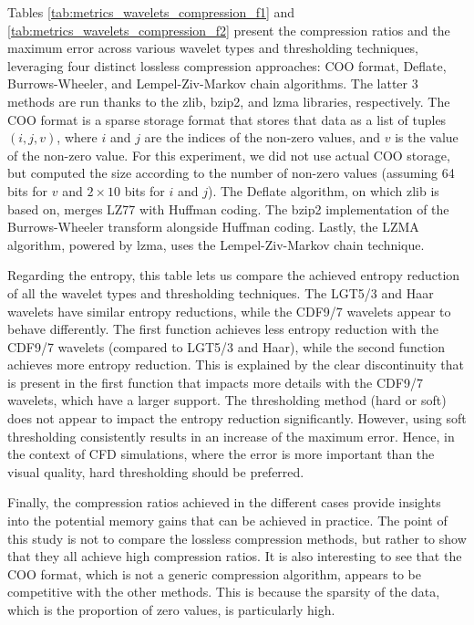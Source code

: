 Tables \ref{tab:metrics_wavelets_compression_f1} and \ref{tab:metrics_wavelets_compression_f2} present the compression ratios and the maximum error across various wavelet types and thresholding techniques, leveraging four distinct lossless compression approaches: COO format, Deflate, Burrows-Wheeler, and Lempel-Ziv-Markov chain algorithms.
The latter 3 methods are run thanks to the zlib, bzip2, and lzma libraries, respectively.
The COO format is a sparse storage format that stores that data as a list of tuples $(i,j,v)$, where $i$ and $j$ are the indices of the non-zero values, and $v$ is the value of the non-zero value.
For this experiment, we did not use actual COO storage, but computed the size according to the number  of non-zero values (assuming 64 bits for $v$ and $2\times10$ bits for $i$ and $j$).
The Deflate algorithm, on which zlib is based on, merges LZ77 with Huffman coding.
The bzip2 implementation of the Burrows-Wheeler transform alongside Huffman coding.
Lastly, the LZMA algorithm, powered by lzma, uses the Lempel-Ziv-Markov chain technique.

Regarding the entropy, this table lets us compare the achieved entropy reduction of all the wavelet types and thresholding techniques.
The LGT5/3 and Haar wavelets have similar entropy reductions, while the CDF9/7 wavelets appear to behave differently.
The first function achieves less entropy reduction with the CDF9/7 wavelets (compared to LGT5/3 and Haar), while the second function achieves more entropy reduction.
This is explained by the clear discontinuity that is present in the first function that impacts more details with the CDF9/7 wavelets, which have a larger support.
The thresholding method (hard or soft) does not appear to impact the entropy reduction significantly.
However, using soft thresholding consistently results in an increase of the maximum error.
Hence, in the context of CFD simulations, where the error is more important than the visual quality, hard thresholding should be preferred.

Finally, the compression ratios achieved in the different cases provide insights into the potential memory gains that can be achieved in practice.
The point of this study is not to compare the lossless compression methods, but rather to show that they all achieve high compression ratios.
It is also interesting to see that the COO format, which is not a generic compression algorithm, appears to be competitive with the other methods.
This is because the sparsity of the data, which is the proportion of zero values, is particularly high.


